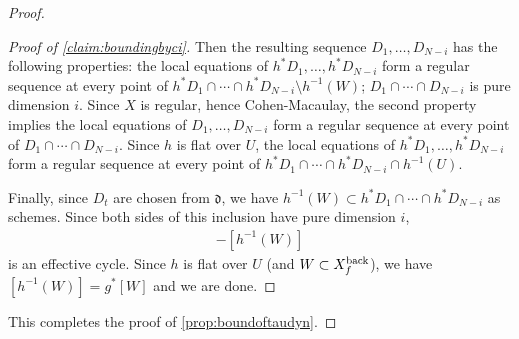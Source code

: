\documentclass[12pt]{amsart}
\theoremstyle{plain}
\theoremstyle{definition}
\numberwithin{equation}{section}
\def\dd{{ \mathfrak{d}}}
\begin{document}
\begin{proof}
\begin{proof}[Proof of \cref{claim:boundingbyci}]
Then the resulting sequence $D_{1}, \dots, D_{N-i}$
has the following properties:
the local equations of $h^{*}D_{1},\dots, h^{*}D_{N-i}$ form a regular sequence at every point
of $h^{*}D_{1}\cap\cdots \cap h^{*}D_{N-i} \setminus h^{-1}(W)$;
$D_{1}\cap\cdots \cap D_{N-i}$ is pure dimension $i$.
Since $X$ is regular, hence Cohen-Macaulay, the second property implies the local equations of $D_{1},\dots, D_{N-i}$
form a regular sequence at every point of $D_{1} \cap \cdots \cap D_{N-i}$.
Since $h$ is flat over $U$, 
the local equations of $h^{*}D_{1},\dots, h^{*}D_{N-i}$ form a regular sequence at every point
of $h^{*}D_{1}\cap\cdots \cap h^{*}D_{N-i} \cap h^{-1}(U)$.

Finally, since $D_{t}$ are chosen from $\dd$, we have
$h^{-1}(W) \subset h^{*}D_{1}\cap\cdots \cap h^{*}D_{N-i}$ as schemes.
Since both sides of this inclusion have pure dimension $i$,
\begin{align}
[h^{*}D_{1}\cap\cdots \cap h^{*}D_{N-i}] - [h^{-1}(W)]
\end{align}
is an effective cycle.
Since $h$ is flat over $U$ (and $W \subset X_{f}^{\rm back}$),
we have $[h^{-1}(W)] = g^{*}[W]$ and we are done.
\end{proof}
This completes the proof of \cref{prop:boundoftaudyn}.
\end{proof}

\end{document}
